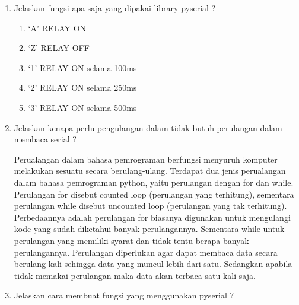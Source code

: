 \begin{enumerate}
\item Jelaskan fungsi apa saja yang dipakai library pyserial ?
\begin{enumerate}
\item ‘A’	RELAY ON
\item ‘Z’	RELAY OFF
\item ‘1’	RELAY ON selama 100ms
\item ‘2’	RELAY ON selama 250ms
\item ‘3’	RELAY ON selama 500ms


\end{enumerate}
\item Jelaskan kenapa perlu pengulangan dalam tidak butuh perulangan dalam membaca serial ? 

Perualangan dalam bahasa pemrograman berfungsi menyuruh komputer melakukan sesuatu secara berulang-ulang. Terdapat dua jenis perualangan dalam bahasa pemrograman python, yaitu perulangan dengan for dan while.
Perulangan for disebut counted loop (perulangan yang terhitung), sementara perulangan while disebut uncounted loop (perulangan yang tak terhitung). Perbedaannya adalah perulangan for biasanya digunakan untuk mengulangi kode yang sudah diketahui banyak perulangannya. Sementara while untuk perulangan yang memiliki syarat dan tidak tentu berapa banyak perulangannya.
Perulangan diperlukan agar dapat membaca data secara berulang kali sehingga data yang muncul lebih dari satu.  Sedangkan apabila tidak memakai perulangan maka data akan terbaca satu kali saja.
\item Jelaskan cara membuat fungsi yang menggunakan pyserial ? 


\end{enumerate}
